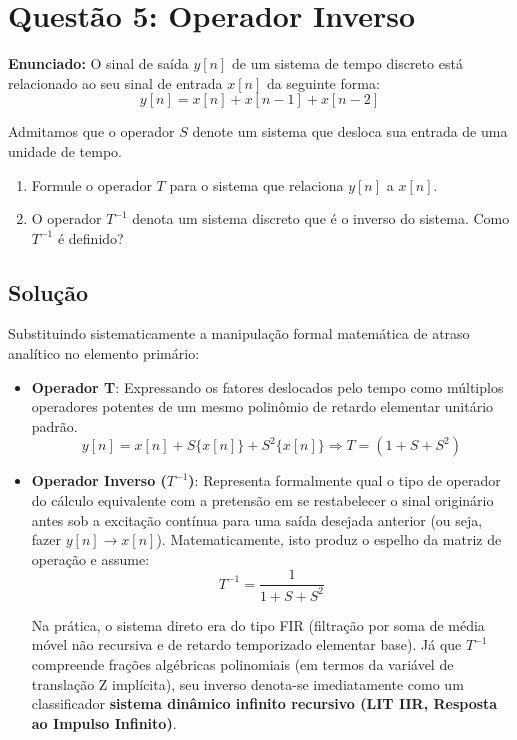 \documentclass[tcc]{classe_uftex/uftex}
\begin{document}
\section{Questão 5: Operador Inverso}

\textbf{Enunciado:} O sinal de saída $y[n]$ de um sistema de tempo discreto est\'a relacionado ao seu sinal de entrada $x[n]$ da seguinte forma:
\begin{equation*}
    y[n] = x[n] + x[n-1] + x[n-2]
\end{equation*}

Admitamos que o operador $S$ denote um sistema que desloca sua entrada de uma unidade de tempo.
\begin{enumerate}
    \item[\textbf{a)}] Formule o operador $T$ para o sistema que relaciona $y[n]$ a $x[n]$.
    \item[\textbf{b)}] O operador $T^{-1}$ denota um sistema discreto que é o inverso do sistema. Como $T^{-1}$ é definido?
\end{enumerate}

\subsection*{Solução}

Substituindo sistematicamente a manipulação formal matemática de atraso analítico no elemento primário:

\begin{itemize}
    \item[\textbf{a)}] \textbf{Operador T}: Expressando os fatores deslocados pelo tempo como múltiplos operadores potentes de um mesmo polinômio de retardo elementar unitário padrão.
    \begin{equation}
        y[n] = x[n] + S\{x[n]\} + S^2\{x[n]\} \Rightarrow T = (1 + S + S^2)
    \end{equation}

    \item[\textbf{b)}] \textbf{Operador Inverso ($T^{-1}$)}: Representa formalmente qual o tipo de operador do cálculo equivalente com a pretensão em se restabelecer o sinal originário antes sob a excitação contínua para uma saída desejada anterior (ou seja, fazer $y[n] \to x[n]$). Matematicamente, isto produz o espelho da matriz de operação e assume:
    \begin{equation}
        T^{-1} = \frac{1}{1 + S + S^2}
    \end{equation}

    Na prática, o sistema direto era do tipo FIR (filtração por soma de média móvel não recursiva e de retardo temporizado elementar base). Já que $T^{-1}$ compreende frações algébricas polinomiais (em termos da variável de translação Z implícita), seu inverso denota-se imediatamente como um classificador \textbf{sistema dinâmico infinito recursivo (LIT IIR, Resposta ao Impulso Infinito)}. 
\end{itemize}
\end{document}
